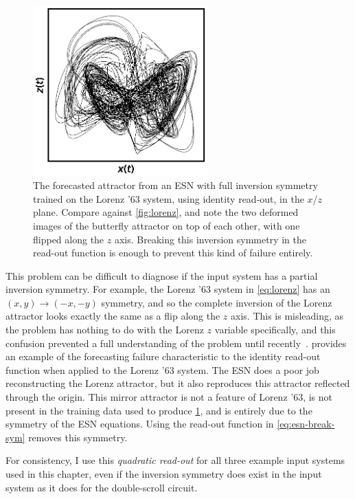 \begin{figure}
  \includegraphics[width=0.6\textwidth]{figures/lorenz-symmetry}
  \caption{The forecasted attractor from an ESN with full inversion
    symmetry trained on the Lorenz '63 system, using identity
    read-out, in the $x$/$z$ plane. Compare against \cref{fig:lorenz},
    and note the two deformed images of the butterfly attractor on top
    of each other, with one flipped along the $z$ axis. Breaking this
    inversion symmetry in the read-out function is enough to prevent
    this kind of failure entirely.}
  \label{fig:lorenz-symmetry}
\end{figure}

This problem can be difficult to diagnose if the input system has a
partial inversion symmetry. For example, the Lorenz '63 system in
\cref{eq:lorenz} has an $(x, y) \rightarrow (-x, -y)$ symmetry, and so
the complete inversion of the Lorenz attractor looks exactly the same
as a flip along the $z$ axis. This is misleading, as the problem has
nothing to do with the Lorenz $z$ variable specifically, and this
confusion prevented a full understanding of the problem until
recently~\cite{herteux2020}.  provides an
example of the forecasting failure characteristic to the identity
read-out function when applied to the Lorenz '63 system. The ESN does
a poor job reconstructing the Lorenz attractor, but it also reproduces
this attractor reflected through the origin. This mirror attractor is
not a feature of Lorenz '63, is not present in the training data used
to produce \cref{fig:lorenz-symmetry}, and is entirely due to the
symmetry of the ESN equations. Using the read-out function in
\cref{eq:esn-break-sym} removes this symmetry.

For consistency, I use this \emph{quadratic read-out} for all three
example input systems used in this chapter, even if the inversion
symmetry does exist in the input system as it does for the double-scroll
circuit.

